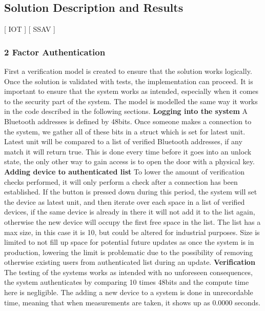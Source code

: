 \subsection{Solution Description and Results}
[ IOT ] [ SSAV ]
\newline
\subsubsection{2 Factor Authentication}
First a verification model is created to ensure that the solution works logically. Once the solution is validated with tests, the implementation can proceed. It is important to ensure that the system works as intended, especially when it comes to the security part of the system. The model is modelled the same way it works in the code described in the following sections.
\newline
\textbf{Logging into the system}\newline
A Bluetooth addresses is defined by 48bits\cite{BluetoothBeacon}. Once someone makes a connection to the system, we gather all of these bits in a struct which is set for latest unit. Latest unit will be compared to a list of verified Bluetooth addresses, if any match it will return true. This is done every time before it goes into an unlock state, the only other way to gain access is to open the door with a physical key.
\newline
\textbf{Adding device to authenticated list}\newline
To lower the amount of verification checks performed, it will only perform a check after a connection has been established. If the button is pressed down during this period, the system will set the device as latest unit, and then iterate over each space in a list of verified devices, if the same device is already in there it will not add it to the list again, otherwise the new device will occupy the first free space in the list. The list has a max size, in this case it is 10, but could be altered for industrial purposes. Size is limited to not fill up space for potential future updates as once the system is in production, lowering the limit is problematic due to the possibility of removing otherwise existing users from authenticated list during an update.
\newline
\textbf{Verification}\newline
The testing of the systems works as intended with no unforeseen consequences, the system authenticates by comparing 10 times 48bits and the compute time here is negligible. The adding a new device to a system is done in unrecordable time, meaning that when measurements are taken, it shows up as 0.0000 seconds.

